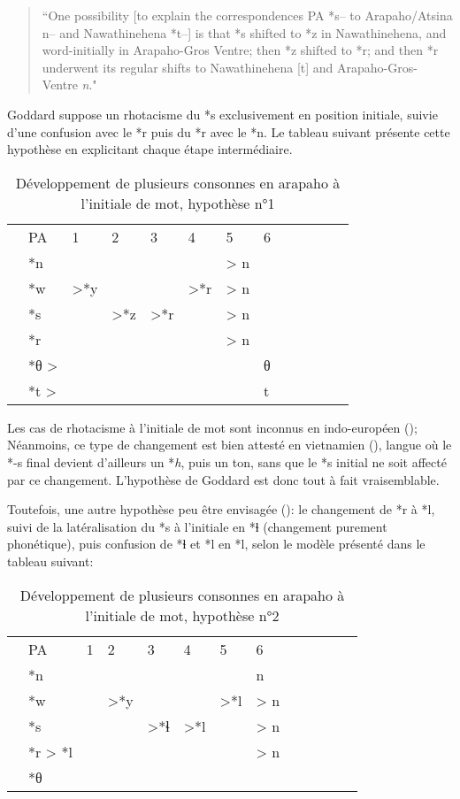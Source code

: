 \documentclass[twoside,a4paper,11pt]{article}
\newcommand{\ipa}[1]{{\phon\textit{#1}}}
\newcommand{\grise}[1]{\cellcolor{lightgray}\textbf{#1}}
\newcommand{\Σ}{\greek{Σ}}
\begin{document}
\begin{quote}
``One possibility [to explain the correspondences PA *s-- to Arapaho/Atsina n-- and Nawathinehena *t--] is that *s shifted to *z in Nawathinehena, and word-initially in Arapaho-Gros Ventre; then *z shifted to *r; and then *r underwent its regular shifts to Nawathinehena [t] and Arapaho-Gros-Ventre \textit{n}."
\end{quote}  
 Goddard suppose un rhotacisme du *s exclusivement en position initiale, suivie d'une confusion avec le *r puis du *r avec le *n. Le tableau suivant présente cette hypothèse en explicitant chaque étape intermédiaire.
\begin{table}[H]
\caption{Développement de plusieurs consonnes en arapaho à l'initiale de mot, hypothèse n°1}  \centering
\begin{tabular}{lllllllllllll}
&PA & 1 & 2 & 3 & 4 & 5 & 6 & \\
&*n   &&&&& > n\\
&*w   & >*y  \grise{} & \grise{} & \grise{}  &>*r	  \grise{} &> n \grise{}\\
&*s  &  &>*z &>*r	 \grise{}& 	 \grise{} &> n \grise{}\\
&*r	   & 	&  & 	& 	  &> n \grise{}\\
&*θ >  & &&&&&θ \\
&*t > & &&&&&t \\
\end{tabular}
\end{table}
Les cas de rhotacisme à l'initiale de mot sont inconnus en indo-européen (\citealt[80-81]{kuemmel07wandel}); Néanmoins, ce type de changement est bien attesté en vietnamien (\citet{ferlus82spirantisation}), langue où le *-s final devient d'ailleurs un *\ipa{h}, puis un ton, sans que le *s initial ne soit affecté par ce changement. L'hypothèse de Goddard est donc tout à fait vraisemblable.


Toutefois, une autre hypothèse peu être envisagée (\citealt{jacques13arapaho}): le changement de *r à *l, suivi de la latéralisation du *s à l'initiale en *ɬ (changement purement phonétique), puis confusion de *ɬ et *l en *l, selon le modèle présenté dans le tableau suivant:
\begin{table}[H]
\caption{Développement de plusieurs consonnes en arapaho à l'initiale de mot, hypothèse n°2}   \centering
\begin{tabular}{lllllllllllll}
&PA & 1 & 2 & 3 & 4 & 5 & 6   \\
&*n  &&&&&& n\\
&*w   && >*y  \grise{}   & \grise{}& \grise{}   &>*l \grise{} &> n \grise{}\\
&*s  && &  >*ɬ  &>*l \grise{}&  \grise{} & > n \grise{}\\
&*r > *l	 &  &  &    &  &    &> n \grise{}\\
&*θ  &  \\
\end{tabular}
\end{table}
\end{document}
